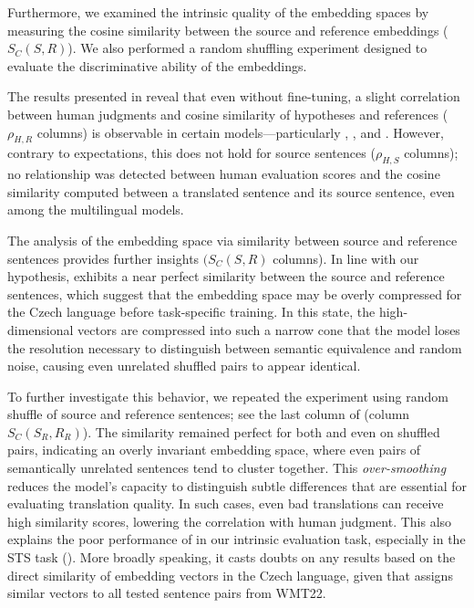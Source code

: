 Furthermore, we examined the intrinsic quality of the embedding spaces by measuring the cosine similarity between the source and reference embeddings ($S_{C}(S,R)$). We also performed a random shuffling experiment designed to evaluate the discriminative ability of the embeddings.

The results presented in  reveal that even without fine-tuning, a slight correlation between human judgments and cosine similarity of hypotheses and references ($\rho_{H,R}$ columns) is observable in certain models---particularly \mepet, \retromae, and \simcse. However, contrary to expectations, this does not hold for source sentences ($\rho_{H,S}$ columns); no relationship was detected between human evaluation scores and the cosine similarity computed between a translated sentence and its source sentence, even among the multilingual models.

The analysis of the embedding space via similarity between source and reference sentences provides further insights $(S_{C}(S,R)$ columns). In line with our hypothesis, \xlmr exhibits a near perfect similarity between the source and reference sentences, which suggest that the \xlmr embedding space may be overly compressed for the Czech language before task-specific training. In this state, the high-dimensional vectors are compressed into such a narrow cone that the model loses the resolution necessary to distinguish between semantic equivalence and random noise, causing even unrelated shuffled pairs to appear identical.

To further investigate this behavior, we repeated the experiment using random shuffle of source and reference sentences; see the last column of  (column $S_{C}(S_{R},R_{R})$). The similarity remained perfect for both \xlmr and \randombert even on shuffled pairs, indicating an overly invariant embedding space, where even pairs of semantically unrelated sentences tend to cluster together. This \emph{over-smoothing} reduces the model's capacity to distinguish subtle differences that are essential for evaluating translation quality. In such cases, even bad translations can receive high similarity scores, lowering the correlation with human judgment. This also explains the poor performance of \xlmr in our intrinsic evaluation task, especially in the STS task ().
More broadly speaking, it casts doubts on any results based on the direct similarity of \xlmr embedding vectors in the Czech language, given that \xlmr assigns similar vectors to all tested sentence pairs from WMT22.

